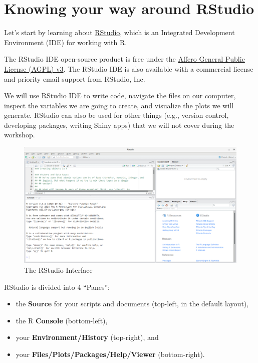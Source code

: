 \documentclass[]{book}
\providecommand{\tightlist}{%
  \setlength{\itemsep}{0pt}\setlength{\parskip}{0pt}}
\begin{document}
\section{Knowing your way around
RStudio}\label{knowing-your-way-around-rstudio}

Let's start by learning about \href{https://www.rstudio.com/}{RStudio},
which is an Integrated Development Environment (IDE) for working with R.

The RStudio IDE open-source product is free under the
\href{https://www.gnu.org/licenses/agpl-3.0.en.html}{Affero General
Public License (AGPL) v3}. The RStudio IDE is also available with a
commercial license and priority email support from RStudio, Inc.

We will use RStudio IDE to write code, navigate the files on our
computer, inspect the variables we are going to create, and visualize
the plots we will generate. RStudio can also be used for other things
(e.g., version control, developing packages, writing Shiny apps) that we
will not cover during the workshop.

\begin{figure}
\includegraphics[width=1\linewidth]{img/rstudio-screenshot} \caption{The RStudio Interface}\label{fig:RStudio-GUI}
\end{figure}

RStudio is divided into 4 ``Panes'':

\begin{itemize}
\tightlist
\item
  the \textbf{Source} for your scripts and documents (top-left, in the
  default layout),
\item
  the R \textbf{Console} (bottom-left),
\item
  your \textbf{Environment/History} (top-right), and
\item
  your \textbf{Files/Plots/Packages/Help/Viewer} (bottom-right).
\end{itemize}
\end{document}
